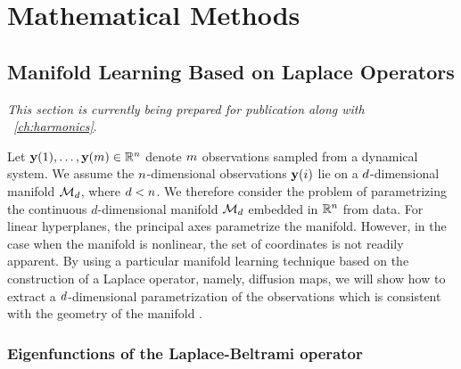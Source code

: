 
\graphicspath{{ch-math/figures/}}

\chapter{Mathematical Methods}\label{ch:math}


\section{Manifold Learning Based on Laplace Operators} \label{sec:manifold_learning}

{\em This section is currently being prepared for publication along with \chap~\ref{ch:harmonics}}.
%
%

Let $\mathbf{y}(1), \dots, \mathbf{y}(m) \in \mathbb{R}^n$ denote $m$ observations sampled from a dynamical system.
%
We assume the $n$-dimensional observations $\mathbf{y}(i)$ lie on a $d$-dimensional manifold $\mathcal{M}_d$, where $d < n$.
%
We therefore consider the problem of parametrizing the continuous $d$-dimensional manifold $\mathcal{M}_d$ embedded in $\mathbb{R}^n$ from data.
%
For linear hyperplanes, the principal axes parametrize the manifold.
%
However, in the case when the manifold is nonlinear, the set of coordinates is not readily apparent.
%
By using a particular manifold learning technique based on the construction of a Laplace operator, namely, diffusion maps, we will show how to extract a $d$-dimensional parametrization of the observations which is consistent with the geometry of the manifold \cite{Belkin2003, coifman2005geometric, singer2008non}.

\subsection{Eigenfunctions of the Laplace-Beltrami operator}

